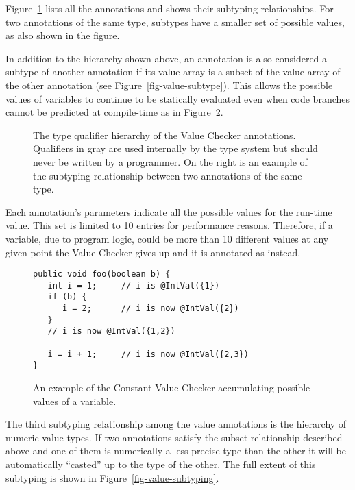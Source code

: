 Figure~\ref{fig-value-hierarchy} lists all the annotations and shows their
subtyping relationships.
For two annotations of the same type, subtypes have a smaller set of
possible values, as also shown in the figure.

In addition to the hierarchy shown above, an annotation is also
considered a subtype of another annotation if its value array is a
subset of the value array of the other annotation (see
Figure~\ref{fig-value-subtype}). This allows the possible values of
variables to continue to be statically evaluated even when code branches cannot be
predicted at compile-time as in Figure~\ref{fig-value-multivalue}.


\begin{figure}
\begin{center}
\qquad\qquad
{}
\vspace{-1.5\baselineskip}
\end{center}

\caption{The type qualifier hierarchy of the Value Checker
annotations. Qualifiers in gray are used
internally by the type system but should never be written by a
programmer.  On the right is an example of the subtyping relationship
between two annotations of the same type.}
\label{fig-value-hierarchy}
\end{figure}

Each annotation's parameters indicate all the possible values for the
run-time value.  This set is limited to 10 entries for
performance reasons. Therefore, if a variable, due to program logic,
could be more than 10 different values at any given point the Value
Checker gives up and it is annotated as
 instead.

\begin{figure}
\begin{Verbatim}
public void foo(boolean b) {
   int i = 1;     // i is @IntVal({1})
   if (b) {  
      i = 2;      // i is now @IntVal({2})
   }        
   // i is now @IntVal({1,2})
   
   i = i + 1;     // i is now @IntVal({2,3})
}
\end{Verbatim}
\caption{An example of the Constant Value Checker accumulating possible values
    of a variable.}
\label{fig-value-multivalue}
\end{figure}

The third subtyping relationship among the value annotations is the
hierarchy of numeric value types. If two annotations satisfy the
subset relationship described above and one of them is numerically a
less precise type than the other it will be automatically ``casted''
up to the type of the other. The full extent of this subtyping is
shown in Figure~\ref{fig-value-subtyping}.

